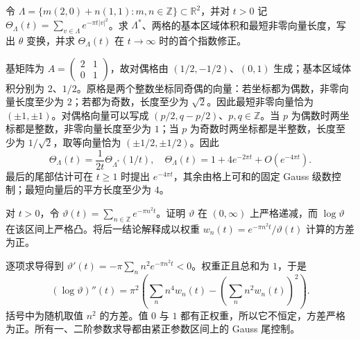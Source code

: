\begin{optionalexercise}\label{b2:ex:06-parity-lattice}
令 \(\Lambda=\{m(2,0)+n(1,1):m,n\in\mathbb Z\}\subset\mathbb R^2\)，并对 \(t>0\) 记 \(\Theta_\Lambda(t)=\sum_{v\in\Lambda}e^{-\pi t|v|^2}\)。求 \(\Lambda^*\)、两格的基本区域体积和最短非零向量长度，写出 \(\theta\) 变换，并求 \(\Theta_\Lambda(t)\) 在 \(t\to\infty\) 时的首个指数修正。
\end{optionalexercise}
\begin{solution}
基矩阵为 \(A=\left(\begin{smallmatrix}2&1\\0&1\end{smallmatrix}\right)\)，故对偶格由 \((1/2,-1/2)\)、\((0,1)\) 生成；基本区域体积分别为 \(2\)、\(1/2\)。原格是两个整数坐标同奇偶的向量：若坐标都为偶数，非零向量长度至少为 \(2\)；若都为奇数，长度至少为 \(\sqrt2\)。因此最短非零向量恰为 \((\pm1,\pm1)\)。对偶格向量可以写成 \((p/2,q-p/2)\)、\(p,q\in\mathbb Z\)。当 \(p\) 为偶数时两坐标都是整数，非零向量长度至少为 \(1\)；当 \(p\) 为奇数时两坐标都是半整数，长度至少为 \(1/\sqrt2\)，取等向量恰为 \((\pm1/2,\pm1/2)\)。因此
\[
 \Theta_\Lambda(t)=\dfrac1{2t}\Theta_{\Lambda^*}(1/t),
 \quad\Theta_\Lambda(t)=1+4e^{-2\pi t}+O(e^{-4\pi t}).
\]
最后的尾部估计可在 \(t\geq1\) 时提出 \(e^{-4\pi t}\)，其余由格上可和的固定 Gauss 级数控制；最短向量后的平方长度至少为 \(4\)。
\end{solution}

\begin{optionalexercise}\label{b2:ex:06-log-convexity}
对 \(t>0\)，令 \(\vartheta(t)=\sum_{n\in\mathbb Z}e^{-\pi n^2t}\)。证明 \(\vartheta\) 在 \((0,\infty)\) 上严格递减，而 \(\log\vartheta\) 在该区间上严格凸。将后一结论解释成以权重 \(w_n(t)=e^{-\pi n^2t}/\vartheta(t)\) 计算的方差为正。
\end{optionalexercise}
\begin{solution}
逐项求导得到 \(\vartheta'(t)=-\pi\sum_nn^2e^{-\pi n^2t}<0\)。权重正且总和为 \(1\)，于是
\[
 (\log\vartheta)''(t)
 =\pi^2\left(\sum_n n^4w_n(t)-\left(\sum_n n^2w_n(t)\right)^2\right).
\]
括号中为随机取值 \(n^2\) 的方差。值 \(0\) 与 \(1\) 都有正权重，所以它不恒定，方差严格为正。所有一、二阶参数求导都由紧正参数区间上的 Gauss 尾控制。
\end{solution}

